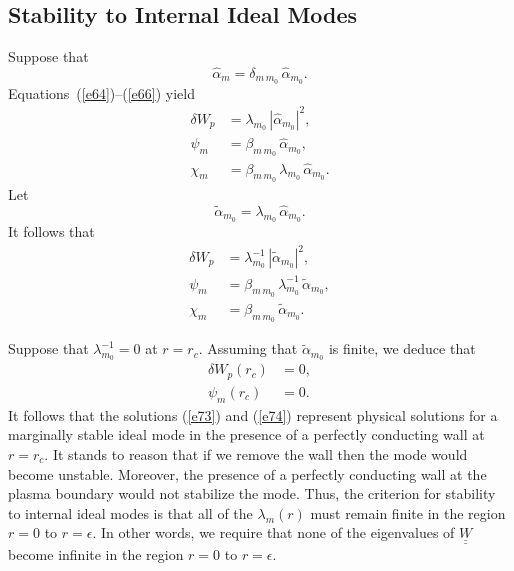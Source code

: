 \documentclass[12pt,prb,aps,notitlepage]{revtex4-1}
\begin{document}
\subsection{Stability to Internal Ideal Modes}
Suppose that
\begin{equation}
\hat{\alpha}_m = \delta_{m\,m_0}\,\hat{\alpha}_{m_0}.
\end{equation}
Equations~(\ref{e64})--(\ref{e66}) yield
\begin{align}
\delta W_p &= \lambda_{m_0}\,|\hat{\alpha}_{m_0}|^2,\\[0.5ex]
\psi_m &= \beta_{m\,m_0}\,\hat{\alpha}_{m_0},\label{e73}\\[0.5ex]
\chi_m &=  \beta_{m\,m_0}\,\lambda_{m_0}\,\hat{\alpha}_{m_0}.\label{e74}
\end{align}
Let 
\begin{equation}
\tilde{\alpha}_{m_0} = \lambda_{m_0}\,\hat{\alpha}_{m_0}.
\end{equation}
It follows that 
\begin{align}
\delta W_p&= \lambda_{m_0}^{-1}\,|\tilde{\alpha}_{m_0}|^2,\\[0.5ex]
\psi_m &= \beta_{m\,m_0}\,\lambda_{m_0}^{-1}\,\tilde{\alpha}_{m_0},\\[0.5ex]
\chi_m&=  \beta_{m\,m_0}\,\tilde{\alpha}_{m_0}.
\end{align}

Suppose that $\lambda_{m_0}^{-1}=0$ at $r=r_c$. Assuming that $\tilde{\alpha}_{m_0}$ is finite, we deduce that
\begin{align}
\delta W_p(r_c) &=0,\\[0.5ex]
\psi_m(r_c) &= 0.
\end{align}
It follows that the solutions (\ref{e73}) and (\ref{e74}) represent physical solutions for a marginally stable ideal mode in the presence of a
perfectly conducting wall at $r=r_c$. It stands to reason that if we remove the wall then the mode would become unstable. Moreover, the
presence of a perfectly conducting wall at the plasma boundary would not stabilize the mode. Thus, the criterion for stability to internal ideal
modes is that all of the $\lambda_m(r)$ must remain finite in the region $r=0$ to $r=\epsilon$. In other words, we require that none of the
eigenvalues of $\underline{\underline{W}}$ become infinite in the region $r=0$ to $r=\epsilon$. 
\end{document}
